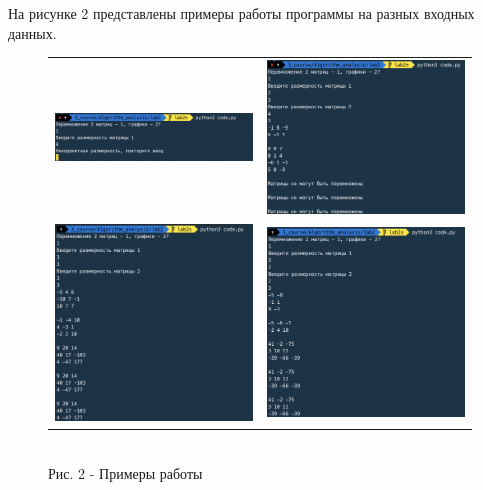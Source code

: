 \documentclass[a4paper,14pt]{article} %
\begin{document}
	На рисунке 2 представлены примеры работы программы на разных входных данных. 
	\begin{figure}[ht]\center
		\begin{tabular}{cc}
			\includegraphics[width=80mm]{ex1} & \includegraphics[width=80mm]{ex2} \\
			\includegraphics[width=80mm]{ex3} & \includegraphics[width=80mm]{ex4}
		\end{tabular}
		\\ Рис. 2 - Примеры работы
	\end{figure}
	        
\end{document}
